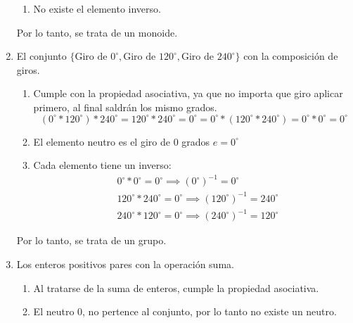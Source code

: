 \begin{enumerate}
\begin{enumerate}
        \item No existe el elemento inverso.
    \end{enumerate}
    
    Por lo tanto, se trata de un monoide.

    \item El conjunto $\{\text{Giro de } 0^{\circ}, \text{Giro de } 120^{\circ}, \text{Giro de } 240^{\circ} \}$ con la composición de giros.

    \begin{enumerate}
        \item Cumple con la propiedad asociativa, ya que no importa que giro aplicar primero, al final saldrán los mismo grados.
        \begin{equation}
            (0^{\circ} * 120^{\circ} ) * 240^{\circ} = 120^{\circ} * 240^{\circ} = 0^{\circ} = 0^{\circ} * (120^{\circ} * 240^{\circ} ) = 0^{\circ} * 0^{\circ} = 0^{\circ}        
        \end{equation}
        \item El elemento neutro es el giro de 0 grados $e = 0^{\circ}$
        \item Cada elemento tiene un inverso:
        \begin{equation}
            \begin{split}
                & 0^{\circ} * 0^{\circ} = 0^{\circ} \implies (0^{\circ})^{-1} = 0^{\circ}\\
                & 120^{\circ} * 240^{\circ} = 0^{\circ} \implies (120^{\circ})^{-1} = 240^{\circ}\\
                & 240^{\circ} * 120^{\circ} = 0^{\circ} \implies (240^{\circ})^{-1} = 120^{\circ}     
            \end{split}
        \end{equation}
    \end{enumerate}

    Por lo tanto, se trata de un grupo.

    \item Los enteros positivos pares con la operación suma.

    \begin{enumerate}
        \item Al tratarse de la suma de enteros, cumple la propiedad asociativa.
        \item El neutro 0, no pertence al conjunto, por lo tanto no existe un neutro.
    \end{enumerate}


\end{enumerate}
